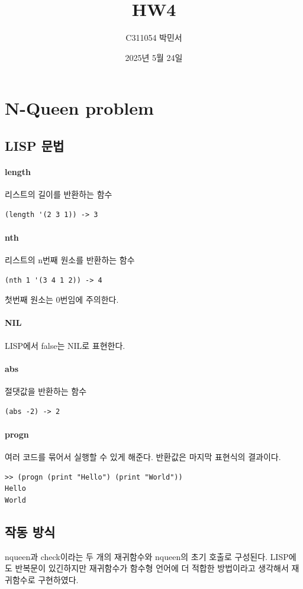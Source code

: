 \documentclass{oblivoir}
\title{HW4}
\author{C311054 박민서}
\date{2025년 5월 24일}
\begin{document}
\maketitle

\section{N-Queen problem}

\subsection{LISP 문법}
\paragraph*{length}
리스트의 길이를 반환하는 함수
\begin{verbatim}
(length '(2 3 1)) -> 3
\end{verbatim}

\paragraph*{nth}
리스트의 n번째 원소를 반환하는 함수
\begin{verbatim}
(nth 1 '(3 4 1 2)) -> 4
\end{verbatim}
첫번째 원소는 0번임에 주의한다.

\paragraph*{NIL}
LISP에서 false는 NIL로 표현한다.

\paragraph*{abs}
절댓값을 반환하는 함수
\begin{verbatim}
(abs -2) -> 2
\end{verbatim}

\paragraph*{progn}
여러 코드를 묶어서 실행할 수 있게 해준다.
반환값은 마지막 표현식의 결과이다.
\begin{verbatim}
>> (progn (print "Hello") (print "World"))
Hello 
World
\end{verbatim}

\subsection{작동 방식}
nqueen과 check이라는 두 개의 재귀함수와 nqueen의 초기 호출로 구성된다.
LISP에도 반복문이 있긴하지만 재귀함수가 함수형 언어에 더 적합한 방법이라고 생각해서 재귀함수로 구현하였다.
\end{document}
